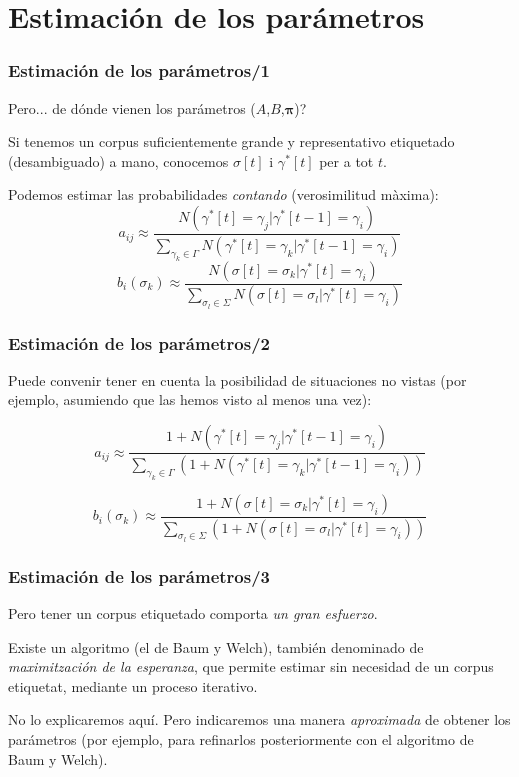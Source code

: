 \documentclass{beamer}
\begin{document}
\section{Estimación de los parámetros}
\begin{frame}
\frametitle{ Estimación de los parámetros/1}

{
{Pero... de dónde vienen los parámetros (\(A\),\(B\),\(\mathbf{\pi}\))?}

{Si tenemos un corpus suficientemente grande y representativo  etiquetado (desambiguado) a mano, 
conocemos \(\sigma[t]\) i \(\gamma^*[t]\) per a tot \(t\). }

{Podemos estimar las probabilidades \emph{contando} (verosimilitud màxima):
\[ a_{ij}\approx \frac{N(\gamma^*[t]=\gamma_j|\gamma^*[t-1]=\gamma_i)}
                     {\sum_{\gamma_k\in\Gamma} N(\gamma^*[t]=\gamma_k|\gamma^*[t-1]=\gamma_i)}  \]
\[ b_{i}(\sigma_k)  \approx
\frac{N(\sigma[t]=\sigma_k|\gamma^*[t]=\gamma_i)}
     {\sum_{\sigma_l\in\Sigma} N(\sigma[t]=\sigma_l|\gamma^*[t]=\gamma_i)} \]         
}
}
\end{frame}
\begin{frame}
\frametitle{ Estimación de los parámetros/2}

{
{Puede convenir tener en cuenta la posibilidad de situaciones no vistas (por ejemplo, asumiendo que las hemos visto al menos una vez):}

{\[ a_{ij}\approx \frac{1+ N(\gamma^*[t]=\gamma_j|\gamma^*[t-1]=\gamma_i)}
                     {\sum_{\gamma_k\in\Gamma} \left(1+
                     N(\gamma^*[t]=\gamma_k|\gamma^*[t-1]=\gamma_i)\right)
                     }\]}


{\[ b_{i}(\sigma_k)  \approx
\frac{1+N(\sigma[t]=\sigma_k|\gamma^*[t]=\gamma_i)}
     {\sum_{\sigma_l\in\Sigma} \left(1+ 
N(\sigma[t]=\sigma_l|\gamma^*[t]=\gamma_i) \right)} \]}


}
\end{frame}
\begin{frame}
\frametitle{ Estimación de los parámetros/3}

{
{Pero tener un corpus etiquetado comporta \emph{un gran esfuerzo}.}

{Existe un algoritmo (el de Baum y Welch), también denominado de
  \emph{maximitzación de la esperanza}, que permite estimar sin necesidad de un corpus etiquetat, mediante un proceso iterativo.}

{No lo explicaremos aquí. Pero indicaremos una manera
  \emph{aproximada} de obtener los parámetros (por ejemplo, para
  refinarlos posteriormente con el algoritmo de Baum y Welch).}
}
\end{frame}
\end{document}
